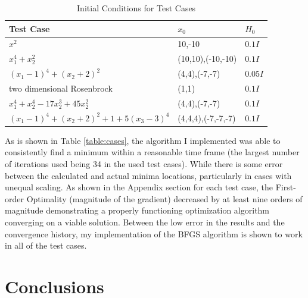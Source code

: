 \documentclass[11pt]{article}%
\begin{document}
\begin{table}[!ht]
\center
\caption{Initial Conditions for Test Cases}
\label{table:initial}
\begin{tabular}{lll}
Test Case                                                                & $x_0$                 & $H_0$    \\ \hline
$x^2$                                                                       & 10,-10                  & $0.1I$    \\
$x_1^4 + x_2^2   $                                                             & (10,10),(-10,-10)              &$0.1I$     \\
$(x_1-1)^4+(x_2+2)^2$                                          & (4,4),(-7,-7)             & $0.05I$ \\
two dimensional Rosenbrock                                               & (1,1)              &    $0.1I$ \\
$x_1^4 + x_2^4 - 17x_2^3 +45 x_2^2$     & (4,4),(-7,-7) & $0.1I$   \\
$(x_1-1)^4+(x_2+2)^2+1+5(x_3-3)^4 $              & (4,4,4),(-7,-7,-7)   & $0.1I$
\end{tabular}
\end{table}

As is shown in Table \ref{table:cases}, the algorithm I implemented was able to consistently find a minimum within a reasonable time frame (the largest number of iterations used being 34 in the used test cases). While there is some error between the calculated and actual minima locations, particularly in cases with unequal scaling. As shown in the Appendix section for each test case, the First-order Optimality (magnitude of the gradient) decreased by at least nine orders of magnitude demonstrating a properly functioning optimization algorithm converging on a viable solution. Between the low error in the results and the convergence history, my implementation of the BFGS algorithm is shown to work in all of the test cases.


\medskip


\section{Conclusions}
\end{document}
